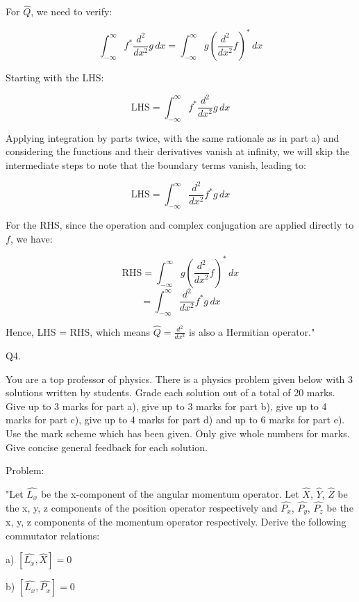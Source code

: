 For \( \hat{Q} \), we need to verify:

\[ \int_{-\infty}^{\infty} f^{*}\frac{d^{2}}{dx^{2}}g \, dx = \int_{-\infty}^{\infty} g(\frac{d^{2}}{dx^{2}}f)^{*} \, dx \]

Starting with the LHS:

\[ \text{LHS} = \int_{-\infty}^{\infty} f^{*}\frac{d^{2}}{dx^{2}}g \, dx \]

Applying integration by parts twice, with the same rationale as in part a) and considering the functions and their derivatives vanish at infinity, we will skip the intermediate steps to note that the boundary terms vanish, leading to:

\[ \text{LHS} = \int_{-\infty}^{\infty} \frac{d^{2}}{dx^{2}}f^{*} g \, dx \]

For the RHS, since the operation and complex conjugation are applied directly to \( f \), we have:

\[ \text{RHS} = \int_{-\infty}^{\infty} g(\frac{d^{2}}{dx^{2}}f)^{*} \, dx \]
\[ = \int_{-\infty}^{\infty} \frac{d^{2}}{dx^{2}}f^{*} g \, dx \]

Hence, LHS = RHS, which means \( \hat{Q} = \frac{d^{2}}{dx^{2}} \) is also a Hermitian operator."



                           Q4. 

You are a top professor of physics. There is a physics problem given below with 3 solutions written by students. Grade each solution out of a total of 20 marks. Give up to 3 marks for part a), give up to 3 marks for part b), give up to 4 marks for part c), give up to 4 marks for part d) and up to 6 marks for part e). Use the mark scheme which has been given. Only give whole numbers for marks. Give concise general feedback for each solution. 

Problem:

"Let \( \hat{L_{x}} \) be the x-component of the angular momentum operator. Let \( \hat{X} \), \( \hat{Y} \), \( \hat{Z} \) be the x, y, z components of the position operator respectively and \( \hat{P_{x}} \), \( \hat{P_{y}} \), \( \hat{P_{z}} \)  be the x, y, z components of the momentum operator respectively. Derive the following commutator relations:

a) \( \left[ \hat{L_{x}}, \hat{X} \right] = 0 \)

b) \( \left[ \hat{L_{x}}, \hat{P_{x}} \right] = 0 \)

